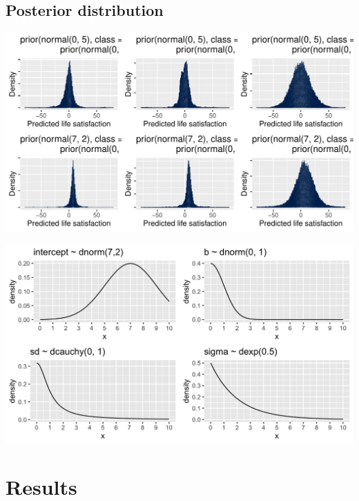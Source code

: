 \documentclass[a4, 12pt]{article}
\begin{document}
\hypertarget{posterior-distribution}{%
\subsection{Posterior distribution}\label{posterior-distribution}}

\label{subsec:posterior}

\includegraphics[width=1\linewidth]{../figures/lsat_predicted}

\includegraphics[width=1\linewidth]{../figures/plot_priors}

\clearpage

\hypertarget{results}{%
\section{Results}\label{results}}

\label{sec:results}
\end{document}
